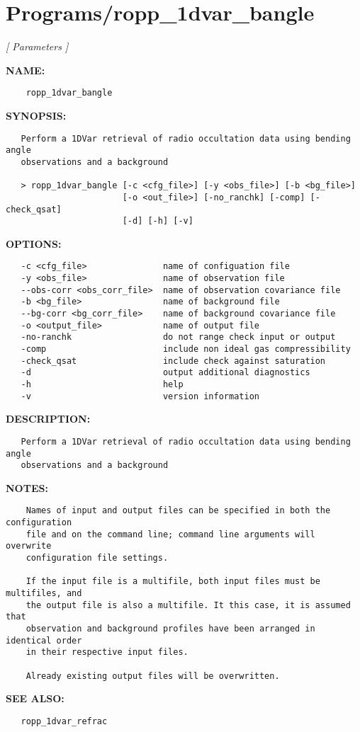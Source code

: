 \section{Programs/ropp\_1dvar\_bangle}
\textsl{[ Parameters ]}

\label{ch:robo45}
\label{ch:Programs_ropp_1dvar_bangle}
\textbf{NAME:}\hspace{0.08in}\begin{Verbatim}
    ropp_1dvar_bangle
\end{Verbatim}
\textbf{SYNOPSIS:}\hspace{0.08in}\begin{Verbatim}
   Perform a 1DVar retrieval of radio occultation data using bending angle
   observations and a background

   > ropp_1dvar_bangle [-c <cfg_file>] [-y <obs_file>] [-b <bg_file>]
                       [-o <out_file>] [-no_ranchk] [-comp] [-check_qsat]
                       [-d] [-h] [-v]
\end{Verbatim}
\textbf{OPTIONS:}\hspace{0.08in}\begin{Verbatim}
   -c <cfg_file>               name of configuation file
   -y <obs_file>               name of observation file
   --obs-corr <obs_corr_file>  name of observation covariance file
   -b <bg_file>                name of background file
   --bg-corr <bg_corr_file>    name of background covariance file
   -o <output_file>            name of output file
   -no-ranchk                  do not range check input or output
   -comp                       include non ideal gas compressibility
   -check_qsat                 include check against saturation
   -d                          output additional diagnostics
   -h                          help
   -v                          version information
\end{Verbatim}
\textbf{DESCRIPTION:}\hspace{0.08in}\begin{Verbatim}
   Perform a 1DVar retrieval of radio occultation data using bending angle
   observations and a background
\end{Verbatim}
\textbf{NOTES:}\hspace{0.08in}\begin{Verbatim}
    Names of input and output files can be specified in both the configuration
    file and on the command line; command line arguments will overwrite
    configuration file settings.

    If the input file is a multifile, both input files must be multifiles, and
    the output file is also a multifile. It this case, it is assumed that
    observation and background profiles have been arranged in identical order
    in their respective input files.

    Already existing output files will be overwritten.
\end{Verbatim}
\textbf{SEE ALSO:}\hspace{0.08in}\begin{Verbatim}
   ropp_1dvar_refrac
\end{Verbatim}

